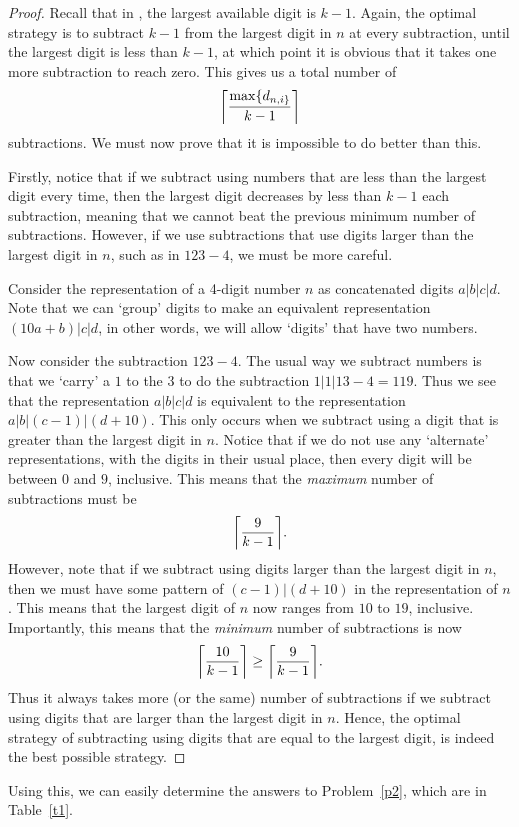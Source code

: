 \begin{proof}
  Recall that in \NTen{}, the largest available digit is $k-1$. Again, the optimal strategy is to subtract $k-1$ from the largest digit in $n$ at every subtraction, until the largest digit is less than $k-1$, at which point it is obvious that it takes one more subtraction to reach zero. This gives us a total number of \[
    \ceil*{\frac{\max\{d_{n, i\}}}{k-1}}
  \] subtractions. We must now prove that it is impossible to do better than this. 

  Firstly, notice that if we subtract using numbers that are less than the largest digit every time, then the largest digit decreases by less than $k-1 $ each subtraction, meaning that we cannot beat the previous minimum number of subtractions. However, if we use subtractions that use digits larger than the largest digit in $n$, such as in $123-4$, we must be more careful.

  Consider the representation of a 4-digit number $n$ as concatenated digits $a|b|c|d$. Note that we can `group' digits to make an equivalent representation $(10a + b)|c|d$, in other words, we will allow `digits' that have two numbers.

  Now consider the subtraction $123-4$. The usual way we subtract numbers is that we `carry' a $1$ to the $3$ to do the subtraction $1|1|13 - 4 = 119$. Thus we see that the representation $a|b|c|d$ is equivalent to the representation $a|b|(c-1)|(d+10)$. This only occurs when we subtract using a digit that is greater than the largest digit in $n$. Notice that if we do not use any `alternate' representations, with the digits in their usual place, then every digit will be between $0$ and $9$, inclusive. This means that the \emph{maximum} number of subtractions must be \[
    \ceil*{\frac{9}{k-1}}
  .\] However, note that if we subtract using digits larger than the largest digit in  $n$, then we must have some pattern of  $(c-1)|(d+10)$ in the representation of  $n$. This means that the largest digit of $n$ now ranges from $10$ to $19$, inclusive. Importantly, this means that the \emph{minimum} number of subtractions is now \[
  \ceil*{\frac{10}{k-1}} \ge \ceil*{\frac{9}{k-1}}
  .\] Thus it always takes more (or the same) number of subtractions if we subtract using digits that are larger than the largest digit in $n$. Hence, the optimal strategy of subtracting using digits that are equal to the largest digit, is indeed the best possible strategy.
\end{proof}
Using this, we can easily determine the answers to Problem~\ref{p2}, which are in Table~\ref{t1}.
